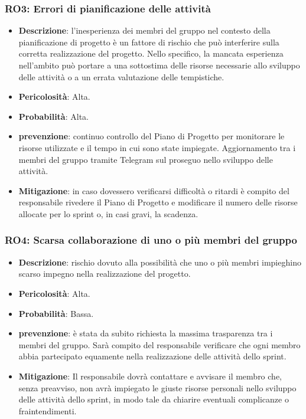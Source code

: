 \subsubsection{RO3: Errori di pianificazione delle attività}
\begin{itemize}
    \item \textbf{Descrizione}: l'inesperienza dei membri del gruppo nel contesto della pianificazione di progetto è un fattore di rischio che può interferire sulla corretta realizzazione del progetto. 
    Nello specifico, la mancata esperienza nell'ambito può portare a una sottostima delle risorse necessarie allo sviluppo delle attività o a un errata valutazione delle tempistiche. 
    \item \textbf{Pericolosità}: Alta.
    \item \textbf{Probabilità}: Alta.
    \item \textbf{prevenzione}: continuo controllo del Piano di Progetto per monitorare le risorse utilizzate e il tempo in cui sono state impiegate.
    Aggiornamento tra i membri del gruppo tramite Telegram sul proseguo nello sviluppo delle attività.
    \item \textbf{Mitigazione}: in caso dovessero verificarsi difficoltà o ritardi è compito del responsabile rivedere il Piano di Progetto e modificare il numero delle risorse allocate per lo sprint o, in casi gravi, la scadenza.
\end{itemize}

\subsubsection{RO4: Scarsa collaborazione di uno o più membri del gruppo}
\begin{itemize}
    \item \textbf{Descrizione}: rischio dovuto alla possibilità che uno o più membri impieghino scarso impegno nella realizzazione del progetto.
    \item \textbf{Pericolosità}: Alta.
    \item \textbf{Probabilità}: Bassa.
    \item \textbf{prevenzione}: è stata da subito richiesta la massima trasparenza tra i membri del gruppo.
    Sarà compito del responsabile verificare che ogni membro abbia partecipato equamente nella realizzazione delle attività dello sprint.
    \item \textbf{Mitigazione}: Il responsabile dovrà contattare e avvisare il membro che, senza preavviso, non avrà impiegato le giuste risorse personali nello sviluppo delle attività dello sprint, in modo tale da chiarire eventuali complicanze o fraintendimenti. 
\end{itemize}

